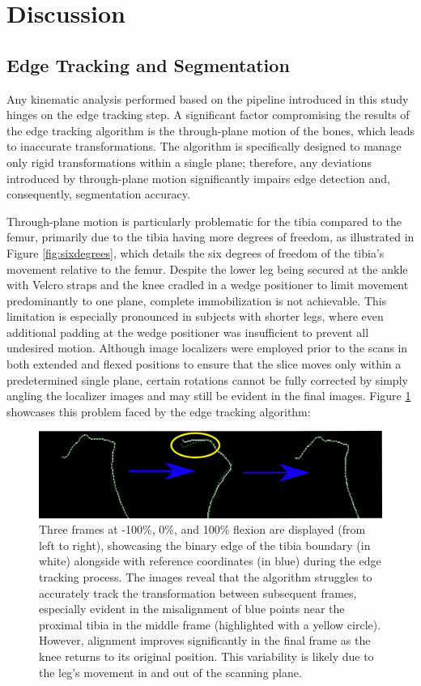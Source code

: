 \documentclass{micro-econ-thesis}
\begin{document}
\section{Discussion}
\label{sec:discussion}

\subsection{Edge Tracking and Segmentation}
Any kinematic analysis performed based on the pipeline introduced in this study hinges on the edge tracking step. A significant factor compromising the results of the edge tracking algorithm is the through-plane motion of the bones, which leads to inaccurate transformations. The algorithm is specifically designed to manage only rigid transformations within a single plane; therefore, any deviations introduced by through-plane motion significantly impairs edge detection and, consequently, segmentation accuracy.

Through-plane motion is particularly problematic for the tibia compared to the femur, primarily due to the tibia having more degrees of freedom, as illustrated in Figure \ref{fig:sixdegrees}, which details the six degrees of freedom of the tibia's movement relative to the femur. Despite the lower leg being secured at the ankle with Velcro straps and the knee cradled in a wedge positioner to limit movement predominantly to one plane, complete immobilization is not achievable. This limitation is especially pronounced in subjects with shorter legs, where even additional padding at the wedge positioner was insufficient to prevent all undesired motion. Although image localizers were employed prior to the scans in both extended and flexed positions to ensure that the slice moves only within a predetermined single plane, certain rotations cannot be fully corrected by simply angling the localizer images and may still be evident in the final images. 
Figure \ref{fig:edgebad} showcases this problem faced by the edge tracking algorithm: 

\begin{figure}[H]
	\centering
	\includegraphics[width=0.9\linewidth]{three_try2}
	\caption{Three frames at -100\%, 0\%, and 100\%  flexion are displayed (from left to right), showcasing the binary edge of the tibia boundary (in white) alongside with reference coordinates (in blue) during the edge tracking process. The images reveal that the algorithm struggles to accurately track the transformation between subsequent frames, especially evident in the misalignment of blue points near the proximal tibia in the middle frame (highlighted with a yellow circle). However, alignment improves significantly in the final frame as the knee returns to its original position. This variability is likely due to the leg's movement in and out of the scanning plane.}
	\label{fig:edgebad}
\end{figure}
\end{document}
